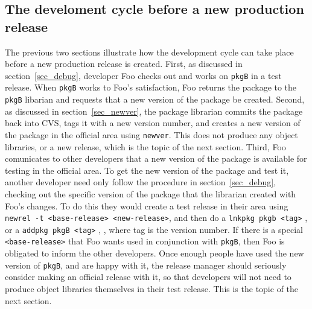 \documentclass[12pt]{article}
\begin{document}
\subsection{The develoment cycle before a new production release}
\label{sec_dev_cycle}
The previous two sections illustrate how the development cycle can take 
place before a new production release is created.  First, as discussed in
section~\ref{sec_debug}, developer Foo checks out and works on \texttt{pkgB}
in a test release. When \texttt{pkgB} works to Foo's satisfaction, Foo returns
the package  to the \texttt{pkgB} libarian and requests that a new version of
the package be created.  Second, as discussed in section~\ref{sec_newver}, the
package  librarian commits the package back into CVS, tags it with a new 
version number, and creates a new version of the package in the official area
using \texttt{newver}.  This does not produce any object libraries, or a new
release, which is the topic of the next section.  Third, Foo comunicates to
other developers that a new version of the package is available for testing
in the official area.  To get the new version of the package and test it, 
another developer need only follow the procedure in section~\ref{sec_debug},
checking out the specific version of the package that the librarian created
with Foo's changes.  To do this they would create a test release in their area
using \texttt{newrel -t <base-release> <new-release>}, 
 and then do a 
\texttt{lnkpkg pkgb <tag>} 
, 
or a \texttt{addpkg pkgB <tag>}
, 
, 
where tag is the 
version number.  If there is 
a special \texttt{<base-release>} that Foo wants used in conjunction with 
\texttt{pkgB}, then Foo is obligated to inform the other developers.  Once 
enough people have used the new version of \texttt{pkgB}, and are happy with
it, the release manager should seriously consider making an official release
with it, so that developers will not need to produce object libraries
themselves in their test release.  This is the topic of the next section.
\end{document}
